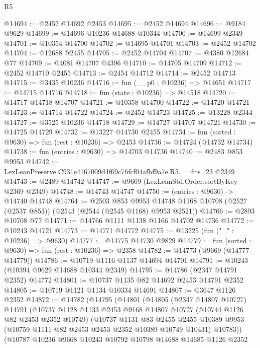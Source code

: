 \begin{lexlean}{R5}
\begin{coremodule}
@14694 := @2452 @14692 @2453
@14695 := @2452 @14694
@14696 := @9184 @9629
@14699 := @14696 @10236 @14688 @10344
@14700 := @14699 @2349
@14701 := @10354 @14700
@14702 := @14695 @14701
@14703 := @2452 @14702
@14704 := @12688 @2455
@14705 := @2452 @14704
@14707 := @4380 @12684 @77
@14709 := @4081 @14707 @4396
@14710 := @14705 @14709
@14712 := @2452 @14710 @2455
@14713 := @2454 @14712
@14714 := @2452 @14713
@14715 := @3435 @10236
@14716 := fun (__p0 : @10236) => @14651
@14717 := @14715 @14716
@14718 := fun (state : @10236) => @14518
@14720 := @14717 @14718 @14707
@14721 := @10358 @14700
@14722 := @14720 @14721
@14723 := @14714 @14722
@14724 := @2452 @14723
@14725 := @13228 @2344
@14727 := @3525 @10236 @14718
@14729 := @14727 @14707 @14721
@14730 := @14725 @14729
@14732 := @13227 @14730 @2455
@14734 := fun (sorted : @9630) => fun (rest : @10236) => @2453
@14736 := @14724 (@14732 @14734)
@14738 := fun (entries : @9630) => @14703 @14736
@14740 := @2483 @853 @9953
@14742 := LexLeanPreserve.C931e4167009d4f69c76fcf04afbf9a7e.R5.__fits_23 @2349
@14743 := @2489 @14742
@14747 := @9669 (LexLeanStd.Order.sortByKey @2369 @2349)
@14748 := @14743 @14747
@14750 := (entries : @9630) -> @14740 @14748
@14764 := @2503
    @853
    @9953
    @14748
    @1168
    @10708
    (@2527 (@2537 @853))
    (@2543 (@2544 (@2545 @1168) @9953 @2521))
@14766 := @2893 @10708 @77
@14771 := @14766 @1111 @1138 @1166 @14702 @14736
@14772 := @10243 @14721
@14773 := @14771 @14772
@14775 := @13225 (fun ("_" : @10236) => @9630)
@14777 := @14775 @14730 @9829
@14779 := fun (sorted : @9630) => fun (rest : @10236) => @2358
@14782 := @14773 (@9669 (@14777 @14779))
@14786 := @10719 @1116 @1137 @14694 @14701
@14791 := @10243 (@10394 @9629 @14688 @10344 @2349)
@14795 := @14786 (@2347 @14791 @2352) @14772
@14801 := @10737 @1135 @82 @14692 @2453 @14791 @2352
@14805 := @10719 @1121 @1134 @10334 @14691
@14807 := @3647 @1126 @2352
@14872 := @14782
    (@14795
      (@14801
        (@14805
          (@2347 @14807 @10727)
          @14791
          (@10737
            @1128
            @1133
            @2453
            @9168
            @14807
            @10727
            (@10744 @1126 @82 @2453 @2352 @10749)
            (@10737
              @1131
              @83
              @2455
              @2455
              @10389
              @9953
              (@10759 @1111 @82 @2453 @2453 @2352 @10389 @10749 @10431)
              @10783))
          (@10787
            @10236
            @9668
            @10243
            @10792
            @10798
            @14688
            @14685
            @1126
            @2352

\end{coremodule}
\end{lexlean}
